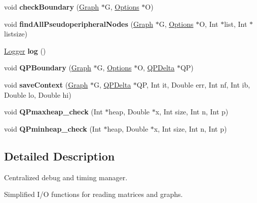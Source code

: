 \begin{DoxyCompactItemize}
\hypertarget{namespace_mongoose_ab0cfa9d3c9f5fd7247f45a196803f493}{}\label{namespace_mongoose_ab0cfa9d3c9f5fd7247f45a196803f493} 
void {\bfseries check\+Boundary} (\hyperlink{class_mongoose_1_1_graph}{Graph} $\ast$G, \hyperlink{struct_mongoose_1_1_options}{Options} $\ast$O)
\item 
\hypertarget{namespace_mongoose_a46c6d80baba4e5c9e817c518be8b28c3}{}\label{namespace_mongoose_a46c6d80baba4e5c9e817c518be8b28c3} 
void {\bfseries find\+All\+Pseudoperipheral\+Nodes} (\hyperlink{class_mongoose_1_1_graph}{Graph} $\ast$G, \hyperlink{struct_mongoose_1_1_options}{Options} $\ast$O, Int $\ast$list, Int $\ast$listsize)
\item 
\hypertarget{namespace_mongoose_ad249585cd23c3d0b125013e237606f8c}{}\label{namespace_mongoose_ad249585cd23c3d0b125013e237606f8c} 
\hyperlink{class_mongoose_1_1_logger}{Logger} {\bfseries log} ()
\item 
\hypertarget{namespace_mongoose_afceb3c550cb48d1551c00b96a4225fe5}{}\label{namespace_mongoose_afceb3c550cb48d1551c00b96a4225fe5} 
void {\bfseries Q\+P\+Boundary} (\hyperlink{class_mongoose_1_1_graph}{Graph} $\ast$G, \hyperlink{struct_mongoose_1_1_options}{Options} $\ast$O, \hyperlink{class_mongoose_1_1_q_p_delta}{Q\+P\+Delta} $\ast$QP)
\item 
\hypertarget{namespace_mongoose_a984d99519ebb5bc2e6aaf44939db65c2}{}\label{namespace_mongoose_a984d99519ebb5bc2e6aaf44939db65c2} 
void {\bfseries save\+Context} (\hyperlink{class_mongoose_1_1_graph}{Graph} $\ast$G, \hyperlink{class_mongoose_1_1_q_p_delta}{Q\+P\+Delta} $\ast$QP, Int it, Double err, Int nf, Int ib, Double lo, Double hi)
\item 
\hypertarget{namespace_mongoose_a4de9f721917e074f053a735709d95239}{}\label{namespace_mongoose_a4de9f721917e074f053a735709d95239} 
void {\bfseries Q\+Pmaxheap\+\_\+check} (Int $\ast$heap, Double $\ast$x, Int size, Int n, Int p)
\item 
\hypertarget{namespace_mongoose_a42a04d910597c6ce87b0b8f6a2fe3833}{}\label{namespace_mongoose_a42a04d910597c6ce87b0b8f6a2fe3833} 
void {\bfseries Q\+Pminheap\+\_\+check} (Int $\ast$heap, Double $\ast$x, Int size, Int n, Int p)
\end{DoxyCompactItemize}


\subsection{Detailed Description}
Centralized debug and timing manager. 

Simplified I/O functions for reading matrices and graphs.

